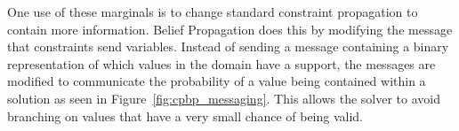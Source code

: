 \documentclass[../Document.tex]{subfiles}
\begin{document}

One use of these marginals is to change standard constraint propagation to contain more information. Belief Propagation does this by modifying the message that constraints send variables. Instead of sending a message containing a binary representation of which values in the domain have a support, the messages are modified to communicate the probability of a value being contained within a solution as seen in Figure~\ref{fig:cpbp_messaging}. This allows the solver to avoid branching on values that have a very small chance of being valid.
\end{document}
